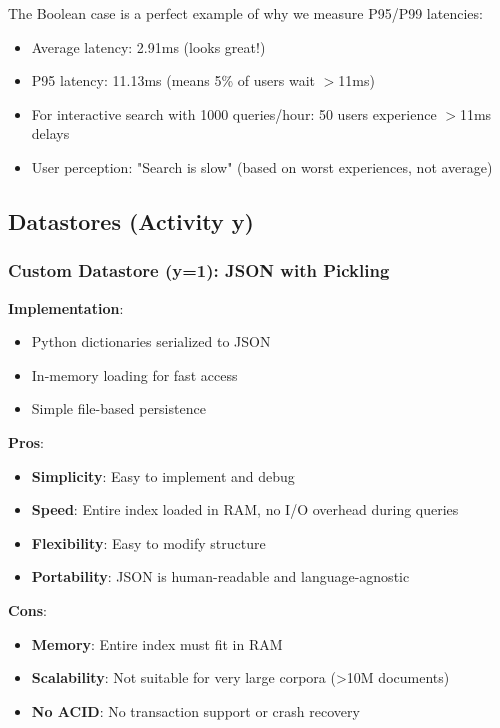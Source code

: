 \documentclass[12pt,a4paper]{article}
\begin{document}
The Boolean case is a perfect example of why we measure P95/P99 latencies:
\begin{itemize}
    \item Average latency: 2.91ms (looks great!)
    \item P95 latency: 11.13ms (means 5\% of users wait $>$11ms)
    \item For interactive search with 1000 queries/hour: 50 users experience $>$11ms delays
    \item User perception: "Search is slow" (based on worst experiences, not average)
\end{itemize}

\subsection{Datastores (Activity y)}

\subsubsection{Custom Datastore (y=1): JSON with Pickling}

\textbf{Implementation}:
\begin{itemize}
    \item Python dictionaries serialized to JSON
    \item In-memory loading for fast access
    \item Simple file-based persistence
\end{itemize}

\textbf{Pros}:
\begin{itemize}
    \item \textbf{Simplicity}: Easy to implement and debug
    \item \textbf{Speed}: Entire index loaded in RAM, no I/O overhead during queries
    \item \textbf{Flexibility}: Easy to modify structure
    \item \textbf{Portability}: JSON is human-readable and language-agnostic
\end{itemize}

\textbf{Cons}:
\begin{itemize}
    \item \textbf{Memory}: Entire index must fit in RAM
    \item \textbf{Scalability}: Not suitable for very large corpora (>10M documents)
    \item \textbf{No ACID}: No transaction support or crash recovery
\end{itemize}
\end{document}
